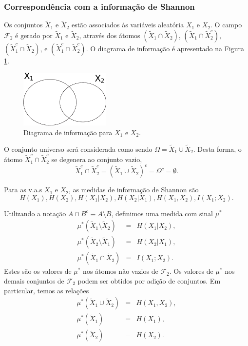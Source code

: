 \begin{frame}[allowframebreaks]
  \frametitle{Correspondência com a informação de Shannon}
  Os conjuntos $\tilde{X}_1$ e $\tilde{X}_2$ estão associados às variáveis
  aleatória $X_1$ e $X_2$. O campo $\mathcal{F}_2$ é gerado por $\tilde{X}_1$ e $\tilde{X}_2$,
  através dos átomos 
  $(\tilde{X}_1 \cap \tilde{X}_2)$,
  $(\tilde{X}_1 \cap \tilde{X}_2^c)$,
  $(\tilde{X}_1^c \cap \tilde{X}_2)$, e
  $(\tilde{X}_1^c \cap \tilde{X}_2^c)$.
  O diagrama de informação é apresentado na Figura \ref{fig:setX1X2}.

  \begin{figure}[h!]
  \centering
  \includegraphics[width=0.4\textwidth]{images/setX1X2.pdf}
  \caption{Diagrama de informação para $X_1$ e $X_2$.}
  \label{fig:setX1X2}
  \end{figure}
 
  O conjunto universo será considerada como sendo $\Omega = \tilde{X}_1 \cup \tilde{X}_2$.
  Desta forma, o átomo $\tilde{X}_1^c \cap \tilde{X}_2^c$ se degenera ao conjunto vazio,
  \begin{equation}
  \tilde{X}_1^c \cap \tilde{X}_2^c = (\tilde{X}_1 \cup \tilde{X}_2)^c = \Omega^c = \emptyset .
  \end{equation}

  Para as v.a.s $X_1$ e $X_2$, as medidas de informação de Shannon são 
  \begin{equation}
  H(X_1), H(X_2), H(X_1|X_2), H(X_2|X_1), H(X_1,X_2), I(X_1;X_2) .
  \end{equation}

  Utilizando a notação $A \cap B^c \equiv A \setminus B$, definimos uma medida com sinal $\mu^\ast$
  \begin{eqnarray}
  \mu^\ast(\tilde{X}_1 \setminus \tilde{X}_2) &=& H(X_1|X_2) ,\\
  \mu^\ast(\tilde{X}_2 \setminus \tilde{X}_1) &=& H(X_2|X_1) ,\\
  \mu^\ast(\tilde{X}_1 \cap \tilde{X}_2) &=& I(X_1;X_2) .
  \end{eqnarray}
  Estes são os valores de $\mu^\ast$ nos átomos não vazios de $\mathcal{F}_2$.
  Os valores de $\mu^\ast$ nos demais conjuntos de $\mathcal{F}_2$ podem ser obtidos por
  adição de conjuntos. Em particular, temos as relações
  \begin{eqnarray}
  \mu^\ast(\tilde{X}_1 \cup \tilde{X}_2) &=& H(X_1, X_2) , \label{eqX1X2HX1X2} \\
  \mu^\ast(\tilde{X}_1) &=& H(X_1) , \label{eqmuX1HX1}\\
  \mu^\ast(\tilde{X}_2) &=& H(X_2) .
  \end{eqnarray}


\end{frame}
